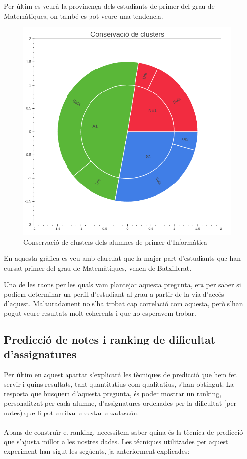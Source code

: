 \documentclass[12pt,a4paper,catalan]{article}
\begin{document}
\newpage

Per últim es veurà la provinença dels estudiants de primer del grau de Matemàtiques, on també es pot veure una tendencia.

\begin{figure}[h]
\centering
\includegraphics[width=.6\linewidth]{img/conservacio_clusters_primer_mates.png}
\caption{Conservació de clusters dels alumnes de primer d'Informàtica}
\end{figure}

En aquesta gràfica es veu amb claredat que la major part d'estudiants que han cursat primer del grau de Matemàtiques, venen de Batxillerat. 

Una de les raons per les quals vam plantejar aquesta pregunta, era per saber si podiem determinar un perfil d'estudiant al grau a partir de la via d'accés d'aquest. Malauradament no s'ha trobat cap correlació com aquesta, però s'han pogut veure resultats molt coherents i que no esperavem trobar.

\newpage

\subsection{Predicció de notes i ranking de dificultat d'assignatures}
Per últim en aquest apartat s'explicará  les tècniques de predicció que hem fet servir i quins resultats, tant quantitatius com qualitatius, s'han obtingut. La resposta que busquem d'aquesta pregunta, és poder mostrar un ranking, personalitzat per cada alumne, d'assignatures ordenades per la dificultat (per notes) que li pot arribar a costar a cadascún.
\\
\\
Abans de construïr el ranking, necessitem saber quina és la tècnica de predicció que s'ajusta millor a les nostres dades. Les técniques utilitzades per aquest experiment han sigut les següents, ja anteriorment explicades:
\end{document}

